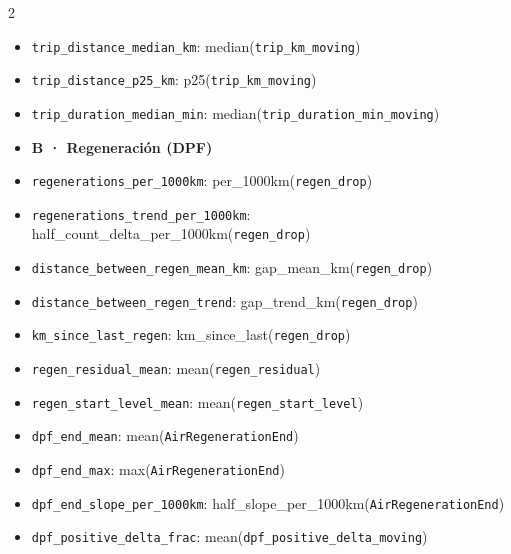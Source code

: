 \begin{multicols}{2}
\begin{itemize}[leftmargin=0pt,itemsep=0pt,label={}]
\item[] \texttt{trip\_\allowbreak{}distance\_\allowbreak{}median\_\allowbreak{}km}: median(\texttt{trip\_\allowbreak{}km\_\allowbreak{}moving})
\item[] \texttt{trip\_\allowbreak{}distance\_\allowbreak{}p25\_\allowbreak{}km}: p25(\texttt{trip\_\allowbreak{}km\_\allowbreak{}moving})
\item[] \texttt{trip\_\allowbreak{}duration\_\allowbreak{}median\_\allowbreak{}min}: median(\texttt{trip\_\allowbreak{}duration\_\allowbreak{}min\_\allowbreak{}moving})
\item[] \textbf{B · Regeneración (DPF)}
\item[] \texttt{regenerations\_\allowbreak{}per\_\allowbreak{}1000km}: per\_\allowbreak{}1000km(\texttt{regen\_\allowbreak{}drop})
\item[] \texttt{regenerations\_\allowbreak{}trend\_\allowbreak{}per\_\allowbreak{}1000km}: half\_\allowbreak{}count\_\allowbreak{}delta\_\allowbreak{}per\_\allowbreak{}1000km(\texttt{regen\_\allowbreak{}drop})
\item[] \texttt{distance\_\allowbreak{}between\_\allowbreak{}regen\_\allowbreak{}mean\_\allowbreak{}km}: gap\_\allowbreak{}mean\_\allowbreak{}km(\texttt{regen\_\allowbreak{}drop})
\item[] \texttt{distance\_\allowbreak{}between\_\allowbreak{}regen\_\allowbreak{}trend}: gap\_\allowbreak{}trend\_\allowbreak{}km(\texttt{regen\_\allowbreak{}drop})
\item[] \texttt{km\_\allowbreak{}since\_\allowbreak{}last\_\allowbreak{}regen}: km\_\allowbreak{}since\_\allowbreak{}last(\texttt{regen\_\allowbreak{}drop})
\item[] \texttt{regen\_\allowbreak{}residual\_\allowbreak{}mean}: mean(\texttt{regen\_\allowbreak{}residual})
\item[] \texttt{regen\_\allowbreak{}start\_\allowbreak{}level\_\allowbreak{}mean}: mean(\texttt{regen\_\allowbreak{}start\_\allowbreak{}level})
\item[] \texttt{dpf\_\allowbreak{}end\_\allowbreak{}mean}: mean(\texttt{AirRegenerationEnd})
\item[] \texttt{dpf\_\allowbreak{}end\_\allowbreak{}max}: max(\texttt{AirRegenerationEnd})
\item[] \texttt{dpf\_\allowbreak{}end\_\allowbreak{}slope\_\allowbreak{}per\_\allowbreak{}1000km}: half\_\allowbreak{}slope\_\allowbreak{}per\_\allowbreak{}1000km(\texttt{AirRegenerationEnd})
\item[] \texttt{dpf\_\allowbreak{}positive\_\allowbreak{}delta\_\allowbreak{}frac}: mean(\texttt{dpf\_\allowbreak{}positive\_\allowbreak{}delta\_\allowbreak{}moving})

\end{itemize}
\end{multicols}
